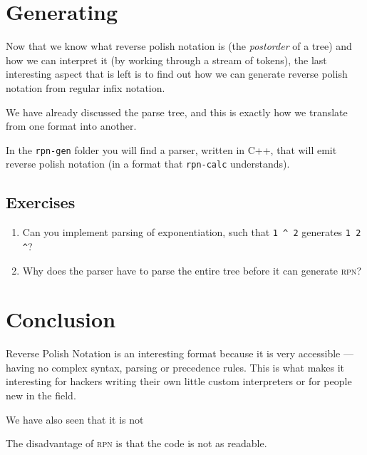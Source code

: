 \documentclass[a4paper,twocolumn]{article}
\begin{document}
\section{Generating}

Now that we know what reverse polish notation is (the \emph{postorder} of a tree) and how we can interpret it (by working through a stream of tokens), the last interesting aspect that is left is to find out how we can generate reverse polish notation from regular infix notation. 

We have already discussed the parse tree, and this is exactly how we translate from one format into another.

In the \verb|rpn-gen| folder you will find a parser, written in C++, that will emit reverse polish notation (in a format that \verb|rpn-calc| understands). 

\subsection*{Exercises}

\begin{enumerate}
  \item Can you implement parsing of exponentiation, such that \verb|1 ^ 2| generates \verb|1 2 ^|?
  \item Why does the parser have to parse the entire tree before it can generate \textsc{rpn}?
\end{enumerate}

\section{Conclusion}

Reverse Polish Notation is an interesting format because it is very accessible — having no complex syntax, parsing or precedence rules. This is what makes it interesting for hackers writing their own little custom interpreters or for people new in the field.

We have also seen that it is not 

The disadvantage of \textsc{rpn} is that the code is not as readable.

\printbibliography
\end{document}
